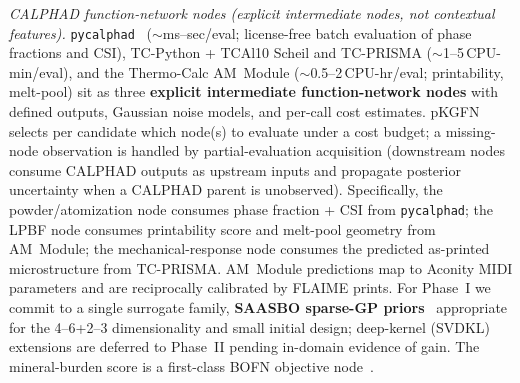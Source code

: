 \documentclass[11pt,letterpaper]{article}
\begin{document}
%
\emph{CALPHAD function-network nodes (explicit intermediate nodes, not
contextual features).}
\texttt{pycalphad}~\cite{otis_2024_97810035} ($\sim$ms--sec/eval; license-free
batch evaluation of phase fractions and CSI), TC-Python + TCAl10 Scheil
and TC-PRISMA ($\sim$1--5\,CPU-min/eval), and the Thermo-Calc AM~Module
($\sim$0.5--2\,CPU-hr/eval; printability, melt-pool) sit as three
\textbf{explicit intermediate function-network nodes} with defined outputs,
Gaussian noise models, and per-call cost estimates. pKGFN selects per
candidate which node(s) to evaluate under a cost budget; a missing-node
observation is handled by partial-evaluation acquisition (downstream
nodes consume CALPHAD outputs as upstream inputs and propagate
posterior uncertainty when a CALPHAD parent is unobserved). Specifically,
the powder/atomization node consumes phase fraction + CSI from
\texttt{pycalphad}; the LPBF node consumes printability score and
melt-pool geometry from AM~Module; the mechanical-response node consumes
the predicted as-printed microstructure from TC-PRISMA. AM~Module
predictions map to Aconity MIDI parameters and are reciprocally
calibrated by FLAIME prints. For Phase~I we commit to a single
surrogate family, \textbf{SAASBO sparse-GP priors}~\cite{eriksson_2021_21030034}
appropriate for the 4--6+2--3 dimensionality and small initial design;
deep-kernel (SVDKL) extensions are deferred to Phase~II pending
in-domain evidence of gain. The mineral-burden score is a first-class
BOFN objective node~\cite{bocklund_2020_20011161,sabanzagil_2025_s4358802}.
\end{document}
